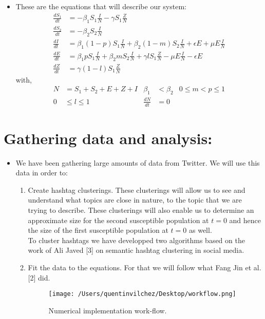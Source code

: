 \documentclass{article}
\begin{document}
\begin{itemize}
\item These are the equations that will describe our system:
\begin{equation} 
\begin{split}
\frac{dS_1}{dt} &= -{\beta}_1 S_1\frac{I}{N} -\gamma S_1\frac{Z}{N}\\
\frac{dS_2}{dt} &= -{\beta}_2 S_2\frac{I}{N}\\
\frac{dI}{dt} &= {\beta}_1 (1-p)S_1\frac{I}{N} + {\beta}_2 (1-m)S_2\frac{I}{N} + \epsilon E + \mu E\frac{I}{N}\\
\frac{dE}{dt} &= {\beta}_1 pS_1\frac{I}{N} + {\beta}_2 mS_2\frac{I}{N} + \gamma       lS_1\frac{Z}{N} - \mu E\frac{I}{N} - \epsilon E\\
\frac{dZ}{dt} &=  \gamma (1-l)S_1\frac{Z}{N}
\end{split}
\end{equation}
with,
\begin{align*}
 N& = S_1 + S_2 + E + Z + I & {\beta}_1 &< {\beta}_2  & 0\leq m<p\leq 1\\
0&\leq l \leq 1  & \frac{dN}{dt}&=0
\end{align*}
\end{itemize}
\section{Gathering data and analysis:}
\begin{itemize}
\item We have been gathering large amounts of data from Twitter. We will use this data in order to:
\begin{enumerate}
\item Create hashtag clusterings. These clusterings will allow us to see and understand what topics are close in nature, to the topic that we are trying to describe. These clusterings will also enable us to determine an approximate size for the second susceptible population at $t=0$ and hence the size of the first susceptible population at $t=0$ as well.
\\To cluster hashtags we have developped two algorithms based on the work of Ali Javed [3] on semantic hashtag clustering in social media. 
\item Fit the data to the equations. For that we will follow what Fang Jin et al. [2] did. 
\begin{figure}[h]

\centering
\texttt{[image: /Users/quentinvilchez/Desktop/workflow.png]}
\caption{Numerical implementation work-flow.}
\end{figure}
\end{enumerate}

\end{itemize}
\end{document}
